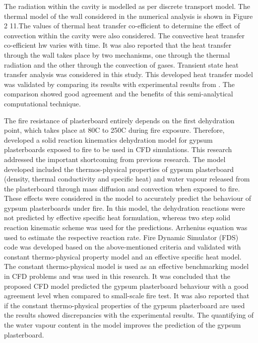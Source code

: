 The radiation within the cavity is modelled as per discrete transport model. The thermal model of the wall considered in the numerical analysis is shown in Figure 2 11.The values of thermal heat transfer co-efficient to determine the effect of convection within the cavity were also considered. The convective heat transfer co-efficient hw varies with time. It was also reported that the heat transfer through the wall takes place by two mechanisms, one through the thermal radiation and the other through the convection of gases. Transient state heat transfer analysis was considered in this study. This developed heat transfer model was validated by comparing its results with experimental results from \citet{Tofilo2005}. The comparison showed good agreement and the benefits of this semi-analytical computational technique. 

The fire resistance of plasterboard entirely depends on the first dehydration point, which takes place at 80\degree C to 250\degree C during fire exposure. Therefore, \citet{Kolaitis2013} developed a solid reaction kinematics dehydration model for gypsum plasterboards exposed to fire to be used in CFD simulations. This research addressed the important shortcoming from previous research. The model developed included the thermos-physical properties of gypsum plasterboard (density, thermal conductivity and specific heat) and water vapour released from the plasterboard through mass diffusion and convection when exposed to fire. These effects were considered in the model to accurately predict the behaviour of gypsum plasterboards under fire. In this model, the dehydration reactions were not predicted by effective specific heat formulation, whereas two step solid reaction kinematic scheme was used for the predictions. Arrhenius equation was used to estimate the respective reaction rate. Fire Dynamic Simulator (FDS) code was developed based on the above-mentioned criteria and validated with constant thermo-physical property model and an effective specific heat model. The constant thermo-physical model is used as an effective benchmarking model in CFD problems and was used in this research. It was concluded that the proposed CFD model predicted the gypsum plasterboard behaviour with a good agreement level when compared to small-scale fire test. It was also reported that if the constant thermo-physical properties of the gypsum plasterboard are used the results showed discrepancies with the experimental results. The quantifying of the water vapour content in the model improves the prediction of the gypsum plasterboard. 

